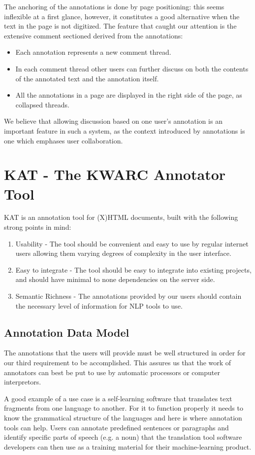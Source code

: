 \documentclass[a4paper, 12pt, notitlepage]{report}
\begin{document}
The anchoring of the annotations is done by page positioning: this seems inflexible at a first glance, however, it constitutes a good alternative when the text in the page is not digitized.
The feature that caught our attention is the extensive comment sectioned derived from the annotations:
\begin{itemize}
 \item Each annotation represents a new comment thread.
 \item In each comment thread other users can further discuss on both the contents of the annotated text and the annotation itself.
 \item All the annotations in a page are displayed in the right side of the page, as collapsed threads.
\end{itemize}
We believe that allowing discussion based on one user's annotation is an important feature in such a system, as the context introduced by annotations is one which emphases user collaboration.
 

\chapter{KAT - The KWARC Annotator Tool}
KAT is an annotation tool for (X)HTML documents, built with the following strong points in
mind:
\begin{enumerate}
\item Usability - The tool should be convenient and easy to use by regular internet users
  allowing them varying degrees of complexity in the user interface.
\item Easy to integrate - The tool should be easy to integrate into existing projects, and
  should have minimal to none dependencies on the server side.
\item Semantic Richness - The annotations provided by our users should contain the
  necessary level of information for NLP tools to use.
\end{enumerate}
\section{Annotation Data Model}
The annotations that the users will provide must be well structured in order for our third
requirement to be accomplished. This assures us that the work of annotators can best be
put to use by automatic processors or computer interpretors.

A good example of a use case is a self-learning software that translates text fragments
from one language to another.  For it to function properly it needs to know the
grammatical structure of the languages and here is where annotation tools can help.  Users
can annotate predefined sentences or paragraphs and identify specific parts of speech
(e.g. a noun) that the translation tool software developers can then use as a training
material for their machine-learning product.
\end{document}
